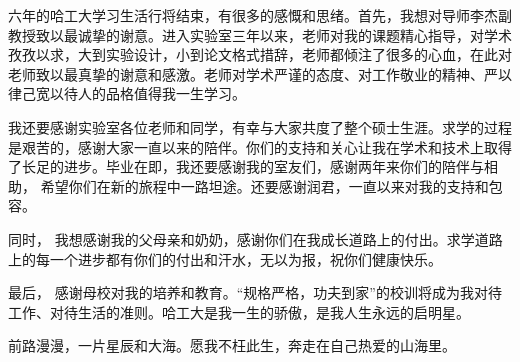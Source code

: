 \begin{acknowledgements}
六年的哈工大学习生活行将结束，有很多的感慨和思绪。首先，我想对导师李杰副教授致以最诚挚的谢意。进入实验室三年以来，老师对我的课题精心指导，对学术孜孜以求，大到实验设计，小到论文格式措辞，老师都倾注了很多的心血，在此对老师致以最真挚的谢意和感激。老师对学术严谨的态度、对工作敬业的精神、严以律己宽以待人的品格值得我一生学习。


我还要感谢实验室各位老师和同学，有幸与大家共度了整个硕士生涯。求学的过程是艰苦的，感谢大家一直以来的陪伴。你们的支持和关心让我在学术和技术上取得了长足的进步。毕业在即，我还要感谢我的室友们，感谢两年来你们的陪伴与相助， 希望你们在新的旅程中一路坦途。还要感谢润君，一直以来对我的支持和包容。

同时， 我想感谢我的父母亲和奶奶，感谢你们在我成长道路上的付出。求学道路上的每一个进步都有你们的付出和汗水，无以为报，祝你们健康快乐。

最后， 感谢母校对我的培养和教育。“规格严格，功夫到家”的校训将成为我对待工作、对待生活的准则。哈工大是我一生的骄傲，是我人生永远的启明星。

前路漫漫，一片星辰和大海。愿我不枉此生，奔走在自己热爱的山海里。
\end{acknowledgements}
